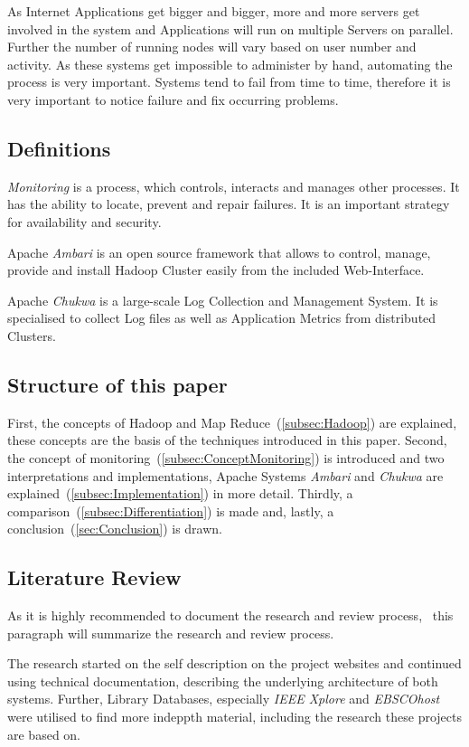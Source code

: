 As Internet Applications get bigger and bigger, more and more servers get involved in the system and Applications will run on multiple Servers on parallel. Further the number of running nodes will vary based on user number and activity. As these systems get impossible to administer by hand, automating the process is very important. Systems tend to fail from time to time, therefore it is very important to notice failure and fix occurring problems.


\subsection{Definitions}

\textit{Monitoring} is a process, which controls, interacts and manages other processes. It has the ability to locate, prevent and repair failures. It is an important strategy for availability and security.

Apache \textit{Ambari} is an open source framework that allows to control, manage, provide and install Hadoop Cluster easily from the included Web-Interface.

Apache \textit{Chukwa} is a large-scale Log Collection and Management System. It is specialised to collect Log files as well as Application Metrics from distributed Clusters.

\subsection{Structure of this paper}
First, the concepts of Hadoop and Map Reduce~(\ref{subsec:Hadoop}) are explained, these concepts are the basis of the techniques introduced in this paper. Second, the concept of monitoring~(\ref{subsec:ConceptMonitoring}) is introduced and two interpretations and implementations, Apache Systems \textit{Ambari} and \textit{Chukwa} are explained~(\ref{subsec:Implementation}) in more detail. Thirdly, a comparison~(\ref{subsec:Differentiation}) is made and, lastly, a conclusion~(\ref{sec:Conclusion}) is drawn.

\subsection{Literature Review}
	As it is highly recommended to document the research and review process,~\cite{brocke09} this paragraph will summarize the research and review process.
	
	The research started on the self description on the project websites and continued using technical documentation, describing the underlying architecture of both systems.
	Further, Library Databases, especially \emph{IEEE Xplore} and \emph{EBSCOhost} were utilised to find more indeppth material, including the research these projects are based on.
	
